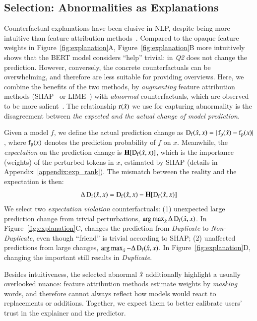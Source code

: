 \subsection{Selection: Abnormalities as Explanations}
\label{subsec:local_explain}


Counterfactual explanations have been elusive in NLP, despite being more intuitive than feature attribution methods~\cite{miller}.
Compared to the opaque feature weights in Figure~\ref{fig:explanation}A, Figure~\ref{fig:explanation}B more intuitively shows that the BERT \qqp model considers ``help'' trivial: 
 in \emph{Q2} does not change the prediction.
However, conversely, the concrete counterfactuals can be overwhelming, and therefore are less suitable for providing overviews.
Here, we combine the benefits of the two methods, by \emph{augmenting} feature attribution methods (\eg SHAP~\cite{NIPS2017_7062} or LIME~\cite{Ribeiro2016WhySI}) with \emph{abnormal} counterfactuals, which are observed to be more salient~\cite{miller}.
The relationship $\operatorname*{r}(\hat{x})$ we use for capturing abnormality is the disagreement between \emph{the expected and the actual change of model prediction.}

Given a model $f$, we define the actual prediction change as $\operatorname*{D_f}(\hat{x}, x)=|\operatorname*{f_p}(\hat{x})-\operatorname*{f_p}(x)|$, where $\operatorname*{f_p}(x)$ denotes the prediction probability of $f$ on $x$.
Meanwhile, the \emph{expectation} on the prediction change is $\operatorname*{\mathbf{H}}[\operatorname*{D_f}(\hat{x}, x)]$, which is the importance (weights) of the perturbed tokens in $x$, estimated by SHAP (details in Appendix~\ref{appendix:exp_rank}).
The mismatch between the reality and the expectation is then:
$$\Delta\operatorname*{D_f}(\hat{x}, x) = \operatorname*{D_f}(\hat{x}, x)-\operatorname*{\mathbf{H}}[\operatorname*{D_f}(\hat{x}, x)]$$
We select two \emph{expectation violation} counterfactuals:
(1) unexpected large prediction change from trivial perturbations, \ie $\operatorname*{arg\,max}_{\hat{x}} \Delta\operatorname*{D_f}(\hat{x}, x)$.
In Figure~\ref{fig:explanation}C,  changes the prediction from \emph{Duplicate} to \emph{Non-Duplicate}, even though ``friend'' is trivial according to SHAP; 
(2) unaffected predictions from large changes, \ie $\operatorname*{arg\,max}_{\hat{x}} -\Delta\operatorname*{D_f}(\hat{x}, x)$. 
In Figure~\ref{fig:explanation}D, changing the important  still results in \emph{Duplicate}.

Besides intuitiveness, the selected abnormal $\hat{x}$ additionally highlight a usually overlooked nuance: feature attribution methods estimate weights by \emph{masking} words, and therefore cannot always reflect how models would react to replacements or additions.
Together, we expect them to better calibrate users' trust in the explainer and the predictor.

